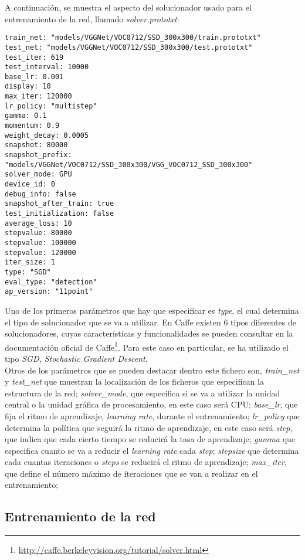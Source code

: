 \documentclass[a4paper, 12pt, oneside]{book}
\begin{document}
A continuación, se muestra el aspecto del solucionador usado para el entrenamiento de la red, llamado \textit{solver.prototxt}:\\

\begin{lstlisting}[frame=single]
train_net: "models/VGGNet/VOC0712/SSD_300x300/train.prototxt"
test_net: "models/VGGNet/VOC0712/SSD_300x300/test.prototxt"
test_iter: 619
test_interval: 10000
base_lr: 0.001
display: 10
max_iter: 120000
lr_policy: "multistep"
gamma: 0.1
momentum: 0.9
weight_decay: 0.0005
snapshot: 80000
snapshot_prefix: "models/VGGNet/VOC0712/SSD_300x300/VGG_VOC0712_SSD_300x300"
solver_mode: GPU
device_id: 0
debug_info: false
snapshot_after_train: true
test_initialization: false
average_loss: 10
stepvalue: 80000
stepvalue: 100000
stepvalue: 120000
iter_size: 1
type: "SGD"
eval_type: "detection"
ap_version: "11point"
\end{lstlisting}

Uno de los primeros parámetros que hay que especificar es \textit{type}, el cual determina el tipo de solucionador que se va a utilizar. En Caffe existen 6 tipos diferentes de solucionadores, cuyas características y funcionalidades se pueden consultar en la documentación oficial de Caffe\footnote{\url{http://caffe.berkeleyvision.org/tutorial/solver.html}}. Para este caso en particular, se ha utilizado el tipo \textit{SGD, Stochastic Gradient Descent}.\\

Otros de los parámetros que se pueden destacar dentro este fichero son, \textit{train\_net} y \textit{test\_net} que muestran la localización de los ficheros que especifican la estructura de la red; \textit{solver\_mode}, que específica si se va a utilizar la unidad central o la unidad gráfica de procesamiento, en este caso será CPU; \textit{base_lr}, que fija el ritmo de aprendizaje, \textit{learning rate}, durante el entrenamiento; \textit{lr_policy} que determina la política que seguirá la ritmo de aprendizaje, en este caso será \textit{step}, que indica que cada cierto tiempo se reducirá la tasa de aprendizaje; \textit{gamma} que especifica cuanto se va a reducir el \textit{learning rate} cada \textit{step}; \textit{stepsize} que determina cada cuantas iteraciones o \textit{steps} se reducirá el ritmo de aprendizaje; \textit{max\_iter}, que define el número máximo de iteraciones que se van a realizar en el entrenamiento;

\subsection{Entrenamiento de la red}
\end{document}
